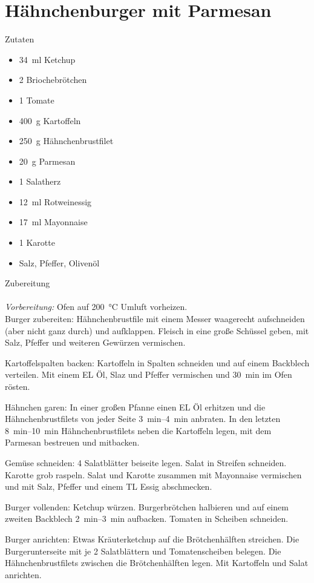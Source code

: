 \section*{Hähnchenburger mit Parmesan}
\ihead{}\ohead{}
\cfoot{}
{\Large Zutaten}
\begin{multicols}{2}
\begin{itemize}
    \item \SI{34}{ml} Ketchup
    \item \num{2} Briochebrötchen
    \item \num{1} Tomate
    \item \SI{400}{g} Kartoffeln
    \item \SI{250}{g} Hähnchenbrustfilet
    \item \SI{20}{g} Parmesan
    \item \num{1} Salatherz
    \item \SI{12}{ml} Rotweinessig
    \item \SI{17}{ml} Mayonnaise
    \item \num{1} Karotte
    \item Salz, Pfeffer, Olivenöl
\end{itemize}
\end{multicols}
\noindent
{\Large Zubereitung}\\
\\
\textit{Vorbereitung:} Ofen auf \SI{200}{\celsius} Umluft vorheizen.\\
Burger zubereiten: Hähnchenbrustfile mit einem Messer waagerecht aufschneiden (aber nicht ganz durch) und aufklappen. 
Fleisch in eine große Schüssel geben, mit Salz, Pfeffer und weiteren Gewürzen vermischen.

Kartoffelspalten backen: Kartoffeln in Spalten schneiden und auf einem Backblech verteilen. 
Mit einem EL Öl, Slaz und Pfeffer vermischen und \SI{30}{min} im Ofen rösten.

Hähnchen garen: In einer großen Pfanne einen EL Öl erhitzen und die Hähnchenbrustfilets von jeder Seite \SIrange{3}{4}{min} anbraten.
In den letzten \SIrange{8}{10}{min} Hähnchenbrustfilets neben die Kartoffeln legen, mit dem Parmesan bestreuen und mitbacken.

Gemüse schneiden: \num{4} Salatblätter beiseite legen. 
Salat in Streifen schneiden. 
Karotte grob raspeln. 
Salat und Karotte zusammen mit Mayonnaise vermischen und mit Salz, Pfeffer und einem TL Essig abschmecken.

Burger vollenden: Ketchup würzen. 
Burgerbrötchen halbieren und auf einem zweiten Backblech \SIrange{2}{3}{min} aufbacken. 
Tomaten in Scheiben schneiden.

Burger anrichten: Etwas Kräuterketchup auf die Brötchenhälften streichen. 
Die Burgerunterseite mit je \num{2} Salatblättern und Tomatenscheiben belegen. 
Die Hähnchenbrustfilets zwischen die Brötchenhälften legen. 
Mit Kartoffeln und Salat anrichten. 
